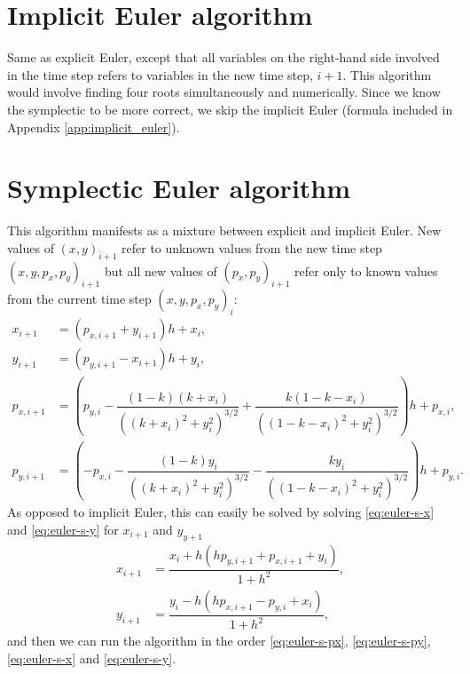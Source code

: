 \section{Implicit Euler algorithm}
Same as explicit Euler, except that all variables on the right-hand side involved in the time step refers to variables in the new time step, $i+1$. This algorithm would involve finding four roots simultaneously and numerically. Since we know the symplectic to be more correct, we skip the implicit Euler (formula included in Appendix \ref{app:implicit_euler}).

\section{Symplectic Euler algorithm}
This algorithm manifests as a mixture between explicit and implicit Euler. New values of $(x,y)_{i+1}$ refer to unknown values from the new time step $(x,y,p_x,p_y)_{i+1}$ but all new values of $(p_x,p_y)_{i+1}$ refer only to known values from the current time step $(x,y,p_x,p_y)_i$:
\begin{align}
x_{i+1} &= (p_{x,i+1} + y_{i+1})h + x_i \label{eq:euler-s-x}, \\[0.2cm]
y_{i+1} &= (p_{y,i+1} - x_{i+1})h + y_i \label{eq:euler-s-y}, \\[0.2cm]
p_{x,i+1} &= \left(p_{y,i} - \dfrac{(1-k)(k+x_i)}{((k+x_i)^2+y_i^2)^{3/2}} + \dfrac{k(1-k-x_i)}{((1-k-x_i)^2+y_i^2)^{3/2}}\right)h + p_{x,i} \label{eq:euler-s-px}, \\[0.2cm]
p_{y,i+1} &= \left(-p_{x,i} - \dfrac{(1-k)y_i}{((k+x_i)^2+y_i^2)^{3/2}} - \dfrac{k y_i}{((1-k-x_i)^2+y_i^2)^{3/2}}\right)h + p_{y,i}. \label{eq:euler-s-py}
\end{align}
As opposed to implicit Euler, this can easily be solved by solving \eqref{eq:euler-s-x} and \eqref{eq:euler-s-y} for $x_{i+1}$ and $y_{y+1}$
\begin{align}
x_{i+1} &= \dfrac{x_i + h(h p_{y,i+1} + p_{x,i+1} + y_i)}{1+h^2}, \label{eq:euler_s_x2} \\[0.5cm]
y_{i+1} &= \dfrac{y_i - h(h p_{x,i+1} - p_{y,i} + x_i)}{1+h^2}, \label{eq:euler_s_y2}
\end{align}
and then we can run the algorithm in the order \eqref{eq:euler-s-px}, \eqref{eq:euler-s-py}, \eqref{eq:euler-s-x} and \eqref{eq:euler-s-y}.

